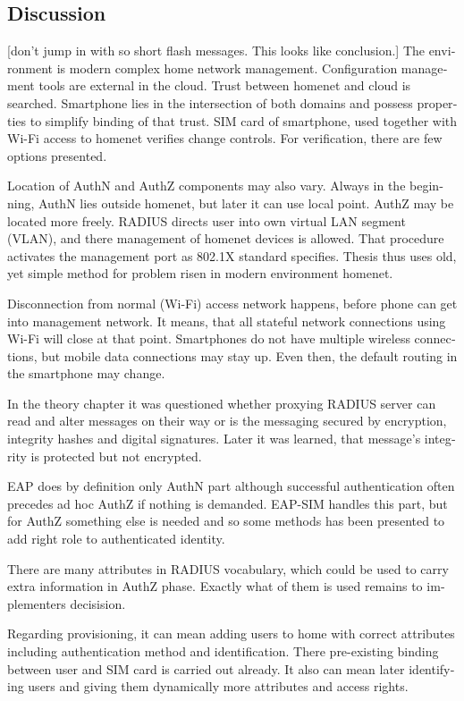 \documentclass[12pt,a4paper,english]{tutthesis}
\begin{document}
\begin{otherlanguage}{english}
\section{Discussion}
\label{sec-6-6}

[don't jump in with so short flash messages. This looks like conclusion.] 
The environment is modern complex home network management.
Configuration management tools are 
external in the cloud. Trust between homenet and cloud is searched.
Smartphone lies in the intersection of both domains 
and possess properties to simplify binding of that trust.
SIM card of smartphone, used together with Wi-Fi access to homenet 
verifies change controls. For verification, there are few options presented.

Location of AuthN and AuthZ components may also vary.
Always in the beginning, AuthN lies outside homenet, but
later it can use local point. AuthZ may be located more freely.
RADIUS directs user into own virtual LAN segment (VLAN),
and there management of homenet devices is allowed.
That procedure activates the management port as 802.1X standard
specifies.
Thesis thus uses old, yet simple method for problem risen in modern environment homenet.

Disconnection from normal (Wi-Fi) access network happens, before phone can get
into management network. It means, that all stateful network
connections using Wi-Fi will close at that point. Smartphones do not
have multiple wireless connections, but mobile data connections may 
stay up. Even then, the default routing in the smartphone may change.

In the theory chapter it was questioned whether proxying RADIUS server
can read and alter messages on their way or is the messaging secured
by encryption, integrity hashes and digital signatures.
Later it was learned, that message's integrity is protected but not encrypted.

EAP does by definition only AuthN part although successful
authentication often precedes ad hoc AuthZ if nothing is demanded.
EAP-SIM handles this part, but for AuthZ something else is needed
and so some methods has been presented to add right role to 
authenticated identity.

There are many attributes in RADIUS vocabulary, which could be 
used to carry extra information in AuthZ phase. Exactly what 
of them is used remains to implementers decisision.

Regarding provisioning, it can mean adding users to home with correct
attributes including authentication method and identification.
There pre-existing binding between user and SIM card is carried out
already. 
It also can mean later identifying users and giving them 
dynamically more attributes and access rights.

\end{otherlanguage}
\end{document}
